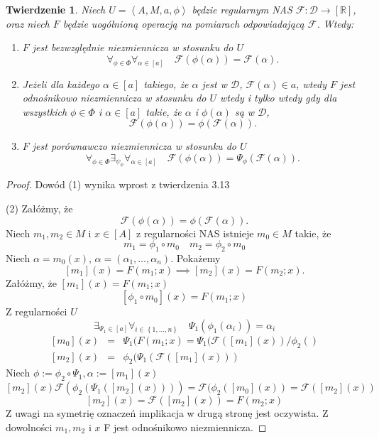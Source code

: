 \documentclass[12pt,a4paper]{report}
\newtheorem{tw}[definition]{Twierdzenie}
\newcommand{\zbior}[1]{\left\lbrace {#1} \right\rbrace }
\newcommand{\domkniecie}[1]{\left\lbrack{#1}\right\rbrack}
\newcommand{\tuple}[1]{\left\langle {#1} \right\rangle}
\begin{document}
\begin{tw}
Niech $U=\tuple{A,M,a,\phi}$ będzie regularnym NAS $\mathcal{F}:\mathcal{D}\to \domkniecie{\mathbb{R}}$, oraz niech $F$ będzie uogólnioną operacją na pomiarach odpowiadającą $\mathcal{F}$. Wtedy:
\begin{enumerate}
\item
$F$ jest bezwzględnie niezmiennicza w stosunku do $U$ 
$$
\forall_{\phi \in \Phi} \forall_{\alpha \in \domkniecie{a}} \quad \mathcal{F}(\phi(\alpha))=\mathcal{F}(\alpha).
$$
\item
Jeżeli dla każdego $\alpha \in \domkniecie{a}$ takiego, że $\alpha$ jest w $\mathcal{D}$, $\mathcal{F}(\alpha)\in a$, wtedy $F$ jest odnośnikowo niezmiennicza w stosunku do $U$ wtedy i tylko wtedy gdy dla wszystkich $\phi \in \Phi$ i $\alpha \in \domkniecie{a}$ takie, że $\alpha$ i $\phi(\alpha)$ są w $\mathcal{D}$,
\begin{equation*}
\mathcal{F}(\phi(\alpha))=\phi(\mathcal{F}(\alpha)).
\end{equation*}
\item
$F$ jest porównawczo niezmiennicza w stosunku do $U$  $$
\forall_{\phi \in \Phi}  \exists_{\psi_{\phi}} \forall_{\alpha \in \domkniecie{a}} \quad \mathcal{F}(\phi(\alpha))=\Psi_{\phi}(\mathcal{F}(\alpha)).
$$
\end{enumerate}
\end{tw}
\begin{proof} 
Dowód (1) wynika wprost z twierdzenia 3.13

(2)
Załóżmy, że 
\begin{equation*}
\mathcal{F}(\phi(\alpha))=\phi(\mathcal{F}(\alpha)).
\end{equation*}
Niech $m_1, m_2 \in M$ i $x\in \domkniecie{A}$ z regularności NAS istnieje $m_0\in M$ takie, że 
$$ 
m_1=\phi_1\circ m_0 \quad m_2=\phi_2\circ m_0
$$
Niech $\alpha=m_0(x)$, $\alpha=(\alpha_1,\dots,\alpha_n)$.
Pokażemy
$$
\domkniecie{m_{1}}(x)=F(m_{1};x) \implies \domkniecie{m_{2}}(x)=F(m_{2};x).
$$
Załóżmy, że $\domkniecie{m_{1}}(x)=F(m_{1};x)$
$$
\domkniecie{\phi_1\circ m_0}(x)=F(m_1;x)
$$
Z regularności $U$ 
$$
\exists_{\Psi_1\in \domkniecie{a}} \forall_{i\in \zbior{1,\dots,n}} \quad \Psi_1(\phi_1(\alpha_i))=\alpha_i
$$
\begin{eqnarray*}
\domkniecie{m_0}(x) & = & \Psi_1(F(m_1;x)=\Psi_1(\mathcal{F}(\domkniecie{m_1}(x))/\phi_2()\\ \domkniecie{m_2}(x)&=&\phi_2(\Psi_1(\mathcal{F}(\domkniecie{m_1}(x)))
\end{eqnarray*}
Niech $\phi:=\phi_2\circ \Psi_1, \alpha:=\domkniecie{m_1}(x)$
$$
\domkniecie{m_2}(x)\mathcal{F}(\phi_2(\Psi_1(\domkniecie{m_2}(x))))=\mathcal{F}(\phi_2(\domkniecie{m_0}(x))=\mathcal{F}(\domkniecie{m_2}(x))
$$
$$
\domkniecie{m_2}(x)=\mathcal{F}(\domkniecie{m_2}(x))= F(m_2;x)
$$
Z uwagi na symetrię oznaczeń implikacja w drugą stronę jest oczywista. Z dowolności $m_1, m_2$ i $x$ F jest odnośnikowo niezmiennicza.
\end{proof}
\end{document}
